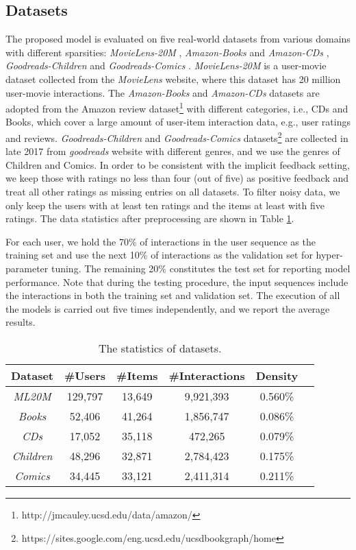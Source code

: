 \documentclass[sigconf]{acmart}
\begin{document}
\subsection{Datasets}
The proposed model is evaluated on five real-world datasets from various domains with different sparsities: \textit{MovieLens-20M} \cite{DBLP:journals/tiis/HarperK16}, \textit{Amazon-Books} and \textit{Amazon-CDs} \cite{DBLP:conf/www/HeM16}, \textit{Goodreads-Children} and \textit{Goodreads-Comics} \cite{DBLP:conf/recsys/WanM18}. \textit{MovieLens-20M} is a user-movie dataset collected from the \textit{MovieLens} website, where this dataset has 20 million user-movie interactions. The \textit{Amazon-Books} and \textit{Amazon-CDs} datasets are adopted from the Amazon review dataset\footnote{http://jmcauley.ucsd.edu/data/amazon/} with different categories, i.e., CDs and Books, which cover a large amount of user-item interaction data, e.g., user ratings and reviews. \textit{Goodreads-Children} and \textit{Goodreads-Comics} datasets\footnote{https://sites.google.com/eng.ucsd.edu/ucsdbookgraph/home} are collected in late 2017 from \textit{goodreads} website with different genres, and we use the genres of Children and Comics. In order to be consistent with the implicit feedback setting, we keep those with ratings no less than four (out of five) as positive feedback and treat all other ratings as missing entries on all datasets. To filter noisy data, we only keep the users with at least ten ratings and the items at least with five ratings. The data statistics after preprocessing are shown in Table \ref{tab:data_statistics}. 

For each user, we hold the 70\% of interactions in the user sequence as the training set and use the next 10\% of interactions as the validation set for hyper-parameter tuning. The remaining 20\% constitutes the test set for reporting model performance. Note that during the testing procedure, the input sequences include the interactions in both the training set and validation set. The execution of all the models is carried out five times independently, and we report the average results.

\begin{table}[ht]
\centering
\caption{\label{tab:data_statistics}The statistics of datasets.}
\begin{tabular}{ |c|c|c|c|c|c| }
 \hline
 Dataset & \#Users & \#Items & \#Interactions & Density \\
 \hline
 \textit{ML20M} & 129,797 & 13,649 & 9,921,393 & 0.560\% \\ 
 \hline
 \textit{Books} & 52,406 & 41,264 & 1,856,747 & 0.086\% \\ 
 \hline
 \textit{CDs} & 17,052 & 35,118 & 472,265 & 0.079\% \\ 
 \hline
 \textit{Children} & 48,296 & 32,871 & 2,784,423 & 0.175\% \\ 
 \hline
 \textit{Comics} & 34,445 & 33,121 & 2,411,314 & 0.211\% \\ 
 \hline
\end{tabular}
\vspace{-0.3cm}
\end{table}
\end{document}
